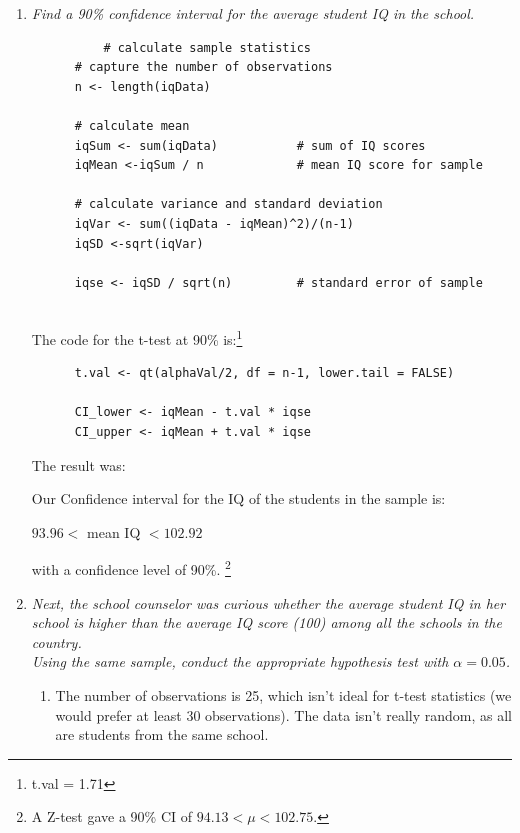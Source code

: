 \documentclass[12pt,letterpaper]{article}
\begin{document}
	\begin{enumerate}
		\item \emph{Find a 90\% confidence interval for the average student IQ in the school.}\\
		  \begin{verbatim}
		  # calculate sample statistics
      # capture the number of observations 
      n <- length(iqData)

      # calculate mean
      iqSum <- sum(iqData)           # sum of IQ scores
      iqMean <-iqSum / n             # mean IQ score for sample

      # calculate variance and standard deviation
      iqVar <- sum((iqData - iqMean)^2)/(n-1) 
      iqSD <-sqrt(iqVar)
      
      iqse <- iqSD / sqrt(n)         # standard error of sample
      
		  \end{verbatim}
      
      The code for the t-test at 90\% is:\footnote{t.val = 1.71}
      
      \begin{verbatim}
      t.val <- qt(alphaVal/2, df = n-1, lower.tail = FALSE)

      CI_lower <- iqMean - t.val * iqse 
      CI_upper <- iqMean + t.val * iqse 

      \end{verbatim}
      The result was:
      
      Our Confidence interval for the IQ of the students in the sample is: 
       
       $93.96 <$ mean IQ $< 102.92$ 
       
       with a confidence level of 90\%.
       \footnote{A Z-test gave a  90\% CI of $94.13 < \mu < 102.75$.}
      
      
		\item \emph{Next, the school counselor was curious  whether  the average student IQ in her school is higher than the average IQ score (100) among all the schools in the country.}\\ 
		\noindent \emph{Using the same sample, conduct the appropriate hypothesis test with $\alpha=0.05$.}
		
		\begin{enumerate}
		    \item The number of observations is 25, which isn't ideal for t-test statistics
		    (we would prefer at least 30 observations).  The data isn't really random, as all are students from the same school.
		    

\end{enumerate}
\end{enumerate}
\end{document}
